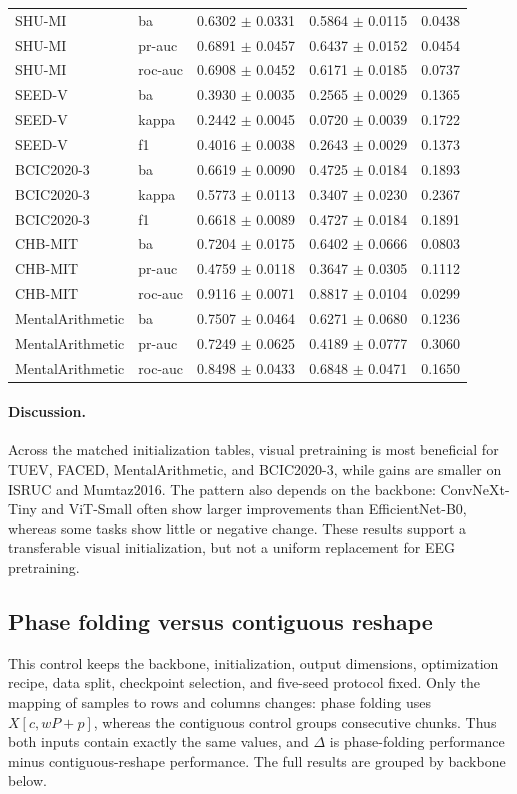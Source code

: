 \begin{table}[tbp]
\begin{tabular}{@{}l l c c c@{}}
SHU-MI & ba & 0.6302 $\pm$ 0.0331 & 0.5864 $\pm$ 0.0115 & 0.0438 \\
SHU-MI & pr-auc & 0.6891 $\pm$ 0.0457 & 0.6437 $\pm$ 0.0152 & 0.0454 \\
SHU-MI & roc-auc & 0.6908 $\pm$ 0.0452 & 0.6171 $\pm$ 0.0185 & 0.0737 \\
SEED-V & ba & 0.3930 $\pm$ 0.0035 & 0.2565 $\pm$ 0.0029 & 0.1365 \\
SEED-V & kappa & 0.2442 $\pm$ 0.0045 & 0.0720 $\pm$ 0.0039 & 0.1722 \\
SEED-V & f1 & 0.4016 $\pm$ 0.0038 & 0.2643 $\pm$ 0.0029 & 0.1373 \\
BCIC2020-3 & ba & 0.6619 $\pm$ 0.0090 & 0.4725 $\pm$ 0.0184 & 0.1893 \\
BCIC2020-3 & kappa & 0.5773 $\pm$ 0.0113 & 0.3407 $\pm$ 0.0230 & 0.2367 \\
BCIC2020-3 & f1 & 0.6618 $\pm$ 0.0089 & 0.4727 $\pm$ 0.0184 & 0.1891 \\
CHB-MIT & ba & 0.7204 $\pm$ 0.0175 & 0.6402 $\pm$ 0.0666 & 0.0803 \\
CHB-MIT & pr-auc & 0.4759 $\pm$ 0.0118 & 0.3647 $\pm$ 0.0305 & 0.1112 \\
CHB-MIT & roc-auc & 0.9116 $\pm$ 0.0071 & 0.8817 $\pm$ 0.0104 & 0.0299 \\
MentalArithmetic & ba & 0.7507 $\pm$ 0.0464 & 0.6271 $\pm$ 0.0680 & 0.1236 \\
MentalArithmetic & pr-auc & 0.7249 $\pm$ 0.0625 & 0.4189 $\pm$ 0.0777 & 0.3060 \\
MentalArithmetic & roc-auc & 0.8498 $\pm$ 0.0433 & 0.6848 $\pm$ 0.0471 & 0.1650 \\
\bottomrule\end{tabular}\end{table}

\paragraph{Discussion.}
Across the matched initialization tables, visual pretraining is most beneficial
for TUEV, FACED, MentalArithmetic, and BCIC2020-3, while gains are smaller on
ISRUC and Mumtaz2016. The pattern also depends on the backbone: ConvNeXt-Tiny
and ViT-Small often show larger improvements than EfficientNet-B0, whereas some
tasks show little or negative change. These results support a transferable
visual initialization, but not a uniform replacement for EEG pretraining.

\subsection{Phase folding versus contiguous reshape}\label{app:fold-reshape-generated}
This control keeps the backbone, initialization, output dimensions, optimization
recipe, data split, checkpoint selection, and five-seed protocol fixed. Only the
mapping of samples to rows and columns changes: phase folding uses
$X[c,wP+p]$, whereas the contiguous control groups consecutive chunks. Thus
both inputs contain exactly the same values, and $\Delta$ is phase-folding
performance minus contiguous-reshape performance. The full results are grouped
by backbone below.

